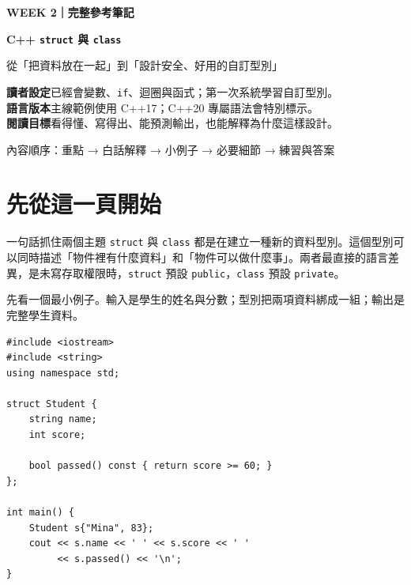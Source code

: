 \documentclass[11pt,a4paper]{article}
\newcommand{\code}[1]{\texttt{#1}}
\begin{document}
\begin{titlepage}
  \pagecolor{Paper}
  \vspace*{20mm}
  {\sffamily\bfseries\color{Blue}\Large WEEK 2｜完整參考筆記}\par
  \vspace{10mm}
  {\sffamily\bfseries\color{Navy}\fontsize{30}{37}\selectfont
    C++ \texttt{struct} 與 \texttt{class}}
  \par\vspace{6mm}
  {\sffamily\color{Ink}\Large
    從「把資料放在一起」到「設計安全、好用的自訂型別」}
  \par\vspace{17mm}

  \begin{tcolorbox}[
    colback=white,colframe=Rule,boxrule=0.7pt,arc=3mm,
    left=5mm,right=5mm,top=4mm,bottom=4mm]
    \textbf{讀者設定}\quad 已經會變數、\code{if}、迴圈與函式；第一次系統學習自訂型別。\\[1mm]
    \textbf{語言版本}\quad 主線範例使用 C++17；C++20 專屬語法會特別標示。\\[1mm]
    \textbf{閱讀目標}\quad 看得懂、寫得出、能預測輸出，也能解釋為什麼這樣設計。
  \end{tcolorbox}

  \vfill
  {\color{Muted}\small
  內容順序：重點 → 白話解釋 → 小例子 → 必要細節 → 練習與答案}
\end{titlepage}
\nopagecolor

\tableofcontents
\clearpage

\section*{先從這一頁開始}

\begin{keybox}{一句話抓住兩個主題}
\code{struct} 與 \code{class} 都是在建立一種新的資料型別。這個型別可以同時描述「物件裡有什麼資料」和「物件可以做什麼事」。兩者最直接的語言差異，是未寫存取權限時，\code{struct} 預設 \code{public}，\code{class} 預設 \code{private}。
\end{keybox}

先看一個最小例子。輸入是學生的姓名與分數；型別把兩項資料綁成一組；輸出是完整學生資料。

\begin{lstlisting}
#include <iostream>
#include <string>
using namespace std;

struct Student {
    string name;
    int score;

    bool passed() const { return score >= 60; }
};

int main() {
    Student s{"Mina", 83};
    cout << s.name << ' ' << s.score << ' '
         << s.passed() << '\n';
}
\end{lstlisting}
\end{document}
